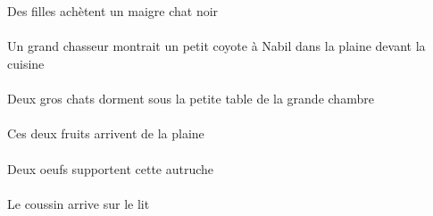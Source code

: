 \begin{exe}
\ex\gll
\INDPlErg{}   \filleCPlErg{}   \INDSgAbs{}   \maigreDSg{}   \noirDSg{}   \chatDSgAbs{}  \acheterVtPrsDSg{}\\
\INDPlErgP{}   \filleCPlErgP{}   \INDSgAbsP{}   \maigreDSgP{}   \noirDSgP{}   \chatDSgAbsP{}  \acheterVtPrsDSgP{}\\
Des filles achètent un maigre chat noir
\ex\gll
\DEFSgObl{}    \DEFSgObl{}   \cuisineDSgObl{}   \DEVANT{}   \plaineASgObl{}   \DANS{}   \INDSgErg{}   \grandCSg{}   \chasseurCSgErg{}    \INDSgDat{}   \NabilDSgDat{}   \INDSgAbs{}   \petitCSg{}   \coyoteCSgAbs{}  \montrerVdPstCSg{}\\
\DEFSgOblP{}    \DEFSgOblP{}   \cuisineDSgOblP{}   \DEVANTP{}   \plaineASgOblP{}   \DANSP{}   \INDSgErgP{}   \grandCSgP{}   \chasseurCSgErgP{}    \INDSgDatP{}   \NabilDSgDatP{}   \INDSgAbsP{}   \petitCSgP{}   \coyoteCSgAbsP{}  \montrerVdPstCSgP{}\\
Un grand chasseur montrait un petit coyote à Nabil dans la plaine devant la cuisine
\ex\gll
\INDDuAbs{}   \grosDDu{}   \chatDDuAbs{}    \DEFSgObl{}    \DEFSgObl{}   \grandBSg{}   \chambreBSgObl{}   \DE{}   \petitDSg{}   \tableDSgObl{}   \SOUS{}  \dormirViPrsDDu{}\\
\INDDuAbsP{}   \grosDDuP{}   \chatDDuAbsP{}    \DEFSgOblP{}    \DEFSgOblP{}   \grandBSgP{}   \chambreBSgOblP{}   \DEP{}   \petitDSgP{}   \tableDSgOblP{}   \SOUSP{}  \dormirViPrsDDuP{}\\
Deux gros chats dorment sous la petite table de la grande chambre
\ex\gll
\DEMDuAbs{}   \fruitADuAbs{}    \DEFSgObl{}   \plaineASgObl{}   \DE{}  \arriverViPrsADu{}\\
\DEMDuAbsP{}   \fruitADuAbsP{}    \DEFSgOblP{}   \plaineASgOblP{}   \DEP{}  \arriverViPrsADuP{}\\
Ces deux fruits arrivent de la plaine
\ex\gll
\INDDuErg{}   \oeufCDuErg{}   \DEMSgAbs{}   \autrucheBSgAbs{}  \supporterVtPrsBSg{}\\
\INDDuErgP{}   \oeufCDuErgP{}   \DEMSgAbsP{}   \autrucheBSgAbsP{}  \supporterVtPrsBSgP{}\\
Deux oeufs supportent cette autruche
\ex\gll
\DEFSgAbs{}   \coussinBSgAbs{}    \DEFSgObl{}   \litDSgObl{}   \SUR{}  \arriverViPrsBSg{}\\
\DEFSgAbsP{}   \coussinBSgAbsP{}    \DEFSgOblP{}   \litDSgOblP{}   \SURP{}  \arriverViPrsBSgP{}\\
Le coussin arrive sur le lit
\ex\gll
\INDSgErg{}   \petitBSg{}   \blancBSg{}   \autrucheBSgErg{}    \DEFSgObl{}   \maisonDSgObl{}   \DEVANT{}   \INDSgAbs{}   \noirBSg{}   \theBSgAbs{}  \boireVtPrsBSg{}\\

\end{exe}
